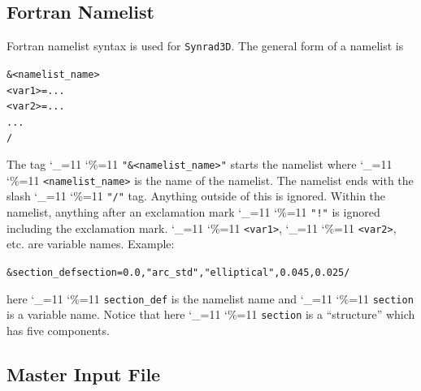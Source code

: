 \documentclass[11pt]{article}
\newcommand{\srthree}{\texttt{Synrad3D}\xspace}
\newcommand\ttcmd{\begingroup\catcode`\_=11 \catcode`\%=11 \dottcmd}
\newcommand\dottcmd[1]{\texttt{#1}\endgroup}
\newcommand{\vn}{\ttcmd}
\newlength{\ExBeg}
\newlength{\ExEnd}
\newenvironment{example}
  {\vspace{\ExBeg} \begin{alltt}}
  {\end{alltt} \vspace{\ExEnd}}
\begin{document}
\subsection{Fortran Namelist}
\label{s:namelist}

Fortran namelist syntax is used for \srthree. The general form
of a namelist is
\begin{example}
  &<namelist_name>
    <var1> = ...
    <var2> = ...
    ...
  /
\end{example}
The tag \vn{"\&<namelist_name>"} starts the namelist where
\vn{<namelist_name>} is the name of the namelist. The namelist ends
with the slash \vn{"/"} tag. Anything outside of this is
ignored. Within the namelist, anything after an exclamation mark
\vn{"!"} is ignored including the exclamation mark. \vn{<var1>},
\vn{<var2>}, etc. are variable names. Example:
\begin{example}
  &section_def section =   0.0, "arc_std", "elliptical", 0.045, 0.025 /
\end{example}
here \vn{section_def} is the namelist name and \vn{section} is a variable
name.  Notice that here \vn{section} is a ``structure'' which has five
components.

\subsection{Master Input File} 
\label{s:master.file}
\end{document}
